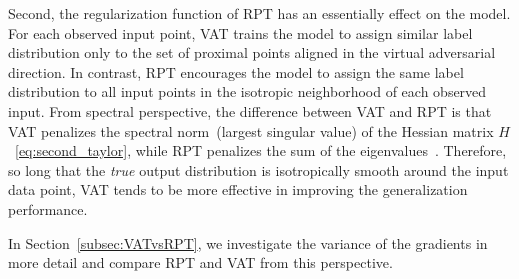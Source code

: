 \documentclass[10pt,journal,compsoc]{IEEEtran}
\newcommand\iwrite[1]{\textcolor{red}{Meada: #1}}
\begin{document}
Second, the regularization function of RPT has an  essentially effect on the model.  
For each observed input point, VAT trains the model to assign similar label distribution only to the set of proximal points aligned in the virtual adversarial direction.
In contrast, RPT encourages the model to assign the same label distribution to all input points in the isotropic neighborhood of each observed input. 
From spectral perspective, the difference between VAT and RPT is that VAT penalizes the spectral norm~(largest singular value) of the Hessian matrix $H$~\eqref{eq:second_taylor}, while RPT penalizes the sum of the eigenvalues~\cite{abbas2016understanding}.
Therefore, so long that the \textit{true} output distribution is isotropically smooth around the input data point, VAT tends to be more effective in improving the generalization performance.

In Section~\ref{subsec:VATvsRPT}, we investigate the variance of the gradients in more detail and compare RPT and VAT from this perspective. 
\end{document}
